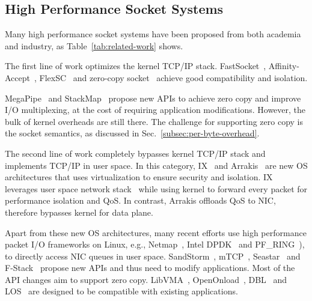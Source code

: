 


\subsection{High Performance Socket Systems}
\label{subsec:related-work}




Many high performance socket systems have been proposed from both academia and industry, as Table~\ref{tab:related-work} shows.

 The first line of work optimizes the kernel TCP/IP stack. FastSocket~\cite{lin2016scalable}, Affinity-Accept~\cite{pesterev2012improving}, FlexSC~\cite{soares2010flexsc} and zero-copy socket~\cite{thadani1995efficient,chu1996zero,linux-zero-copy} achieve good compatibility and isolation.

MegaPipe~\cite{han2012megapipe} and StackMap~\cite{yasukata2016stackmap} propose new APIs to achieve zero copy and improve I/O multiplexing, at the cost of requiring application modifications.
However, the bulk of kernel overheads are still there.
The challenge for supporting zero copy is the socket semantics, as discussed in Sec.~\ref{subsec:per-byte-overhead}.

 The second line of work completely bypasses kernel TCP/IP stack and implements TCP/IP in user space.
In this category, IX~\cite{belay2017ix} and Arrakis~\cite{peter2016arrakis} are new OS architectures that uses virtualization to ensure security and isolation. IX leverages user space network stack~\cite{dunkels2001design} while using kernel to forward every packet for performance isolation and QoS. In contrast, Arrakis offloads QoS to NIC, therefore bypasses kernel for data plane.%

Apart from these new OS architectures, many recent efforts use high performance packet I/O frameworks on Linux, e.g., Netmap~\cite{rizzo2012netmap}, Intel DPDK~\cite{dpdk} and PF\_RING~\cite{pf-ring}), to directly access NIC queues in user space.
SandStorm~\cite{marinos2014network}, mTCP~\cite{jeong2014mtcp}, Seastar~\cite{seastar} and F-Stack~\cite{fstack} propose new APIs and thus need to modify applications.
Most of the API changes aim to support zero copy.
LibVMA~\cite{libvma}, OpenOnload~\cite{openonload}, DBL~\cite{dbl} and LOS~\cite{huang2017high} are designed to be compatible with existing applications.

